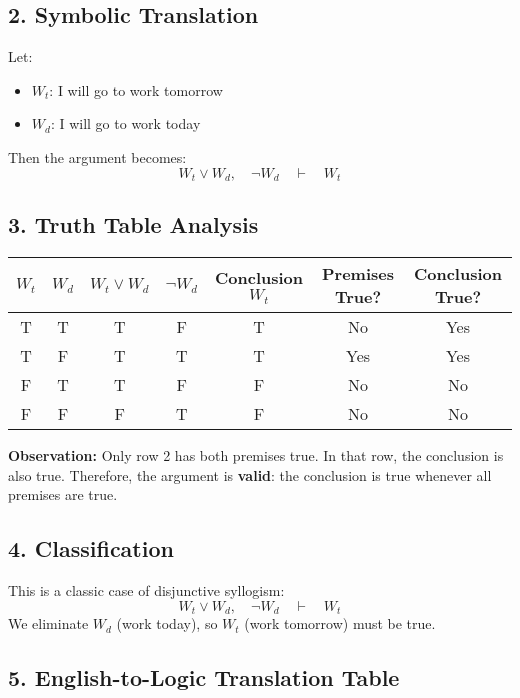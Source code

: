 \documentclass[10pt]{article}
\theoremstyle{plain}
\theoremstyle{definition}
\begin{document}
  \subsection*{2. Symbolic Translation}
  Let:
  \begin{itemize}
  	\item $W_t$: I will go to work tomorrow
  	\item $W_d$: I will go to work today
  \end{itemize}
  
  Then the argument becomes:
  \[
  W_t \lor W_d,\quad \lnot W_d \quad \vdash \quad W_t
  \]
  
  \subsection*{3. Truth Table Analysis}
  
  \begin{center}
  	\begin{tabular}{|c|c|c|c|c|c|c|}
  		\hline
  		$W_t$ & $W_d$ & $W_t \lor W_d$ & $\lnot W_d$ & Conclusion $W_t$ & Premises True? & Conclusion True? \\
  		\hline
  		T & T & T & F & T & No & Yes \\
  		T & F & T & T & T & Yes & Yes \\
  		F & T & T & F & F & No & No \\
  		F & F & F & T & F & No & No \\
  		\hline
  	\end{tabular}
  \end{center}
  
  \textbf{Observation:}  
  Only row 2 has both premises true. In that row, the conclusion is also true.  
  Therefore, the argument is \textbf{valid}: the conclusion is true whenever all premises are true.
  
  \subsection*{4. Classification}
  
  This is a classic case of disjunctive syllogism:
  \[
  W_t \lor W_d,\quad \lnot W_d \quad \vdash \quad W_t
  \]
  We eliminate $W_d$ (work today), so $W_t$ (work tomorrow) must be true.
  
  \subsection*{5. English-to-Logic Translation Table}
  
\end{document}
